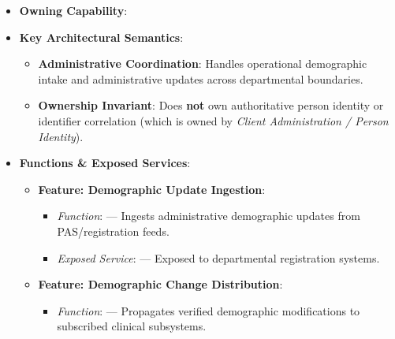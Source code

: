 \begin{itemize}

\item 
\textbf{Owning Capability}: \texttt{}



\item 
\textbf{Key Architectural Semantics}:


\begin{itemize}

\item 
\textbf{Administrative Coordination}: Handles operational demographic intake and administrative updates across departmental boundaries.



\item 
\textbf{Ownership Invariant}: Does \textbf{not} own authoritative person identity or identifier correlation (which is owned by \emph{Client Administration /\allowbreak{} Person Identity}).



\end{itemize}


\item 
\textbf{Functions \& Exposed Services}:


\begin{itemize}

\item 
\textbf{Feature: Demographic Update Ingestion}:


\begin{itemize}

\item 
\emph{Function}: \texttt{} — Ingests administrative demographic updates from PAS/\allowbreak{}registration feeds.



\item 
\emph{Exposed Service}: \texttt{} — Exposed to departmental registration systems.



\end{itemize}


\item 
\textbf{Feature: Demographic Change Distribution}:


\begin{itemize}

\item 
\emph{Function}: \texttt{} — Propagates verified demographic modifications to subscribed clinical subsystems.




\end{itemize}
\end{itemize}
\end{itemize}
